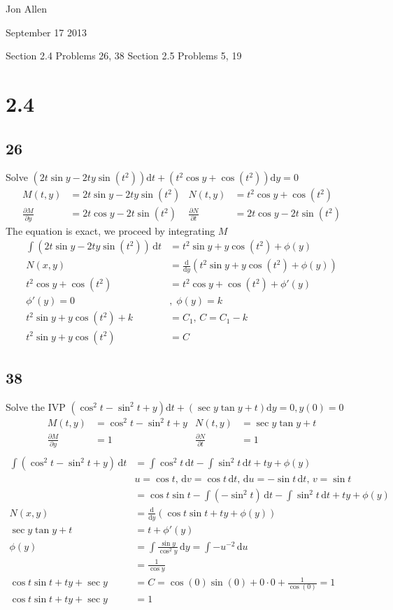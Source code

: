 \documentclass{article}
\begin{document}
Jon Allen

September 17 2013

Section 2.4 Problems 26, 38 Section 2.5 Problems 5, 19
\section*{2.4}
\subsection*{26}
Solve $\left(2t\sin y-2ty\sin(t^2)\right)\mathrm{d}t+\left(t^2\cos y+\cos(t^2)\right)\mathrm{d}y=0$
\begin{align*}
M(t,y)&=2t\sin y-2ty\sin(t^2) & N(t,y)&=t^2\cos y+\cos(t^2)\\
\frac{\partial M}{\partial y}&=2t\cos y-2t\sin(t^2) & \frac{\partial N}{\partial t}&=2t\cos y - 2t\sin(t^2)
\end{align*}
The equation is exact, we proceed by integrating $M$
\begin{align*}
\int{\left(2t\sin y-2ty\sin(t^2)\right)\,\mathrm{d}t}&=t^2\sin y+y\cos(t^2)+\phi(y)\\
N(x,y)&=\frac{\mathrm{d}}{\mathrm{d}y}\left(t^2\sin y+y\cos(t^2)+\phi(y)\right)\\
t^2\cos y+\cos(t^2)&=t^2\cos y+\cos(t^2)+\phi'(y)\\
\phi'(y)=0&,\; \phi(y)=k\\
t^2\sin y+y\cos(t^2) + k&=C_1,\,C=C_1-k\\
t^2\sin y+y\cos(t^2)&=C
\end{align*}
\subsection*{38}
Solve the IVP $\left(\cos^2 t-\sin^2 t+y\right)\mathrm{d}t+\left(\sec y \tan y + t\right)\mathrm{d}y=0,y(0)=0$
\begin{align*}
M(t,y)&=\cos^2 t-\sin^2 t+y & N(t,y)&=\sec y \tan y + t\\
\frac{\partial M}{\partial y}&=1 & \frac{\partial N}{\partial t}&=1\\
\end{align*}
\begin{align*}
\int{\left(\cos^2 t - \sin^2 t + y\right)\,\mathrm{d}t}&=\int{\cos^2 t\,\mathrm{d}t} - \int{\sin^2 t\,\mathrm{d}t} + ty+\phi(y)\\
&u=\cos t,\,\mathrm{d}v=\cos t\,\mathrm{d}t,\,\mathrm{d}u=-\sin t\,\mathrm{d}t,\,v=\sin t\\
&=\cos t\sin t-\int{\left(-\sin^2t\right)\,\mathrm{d}t} - \int{\sin^2 t\,\mathrm{d}t} + ty+\phi(y)\\
N(x,y)&=\frac{\mathrm{d}}{\mathrm{d}y}\left(\cos t\sin t+ty+\phi(y)\right)\\
\sec y \tan y + t&=t+\phi'(y)\\
\phi(y)&=\int{\frac{\sin y}{\cos^2 y}\,\mathrm{d}y}=\int{-u^{-2}\,\mathrm{d}u}\\
&=\frac{1}{\cos y}\\
\cos t\sin t+ty+\sec y&=C=\cos(0)\sin(0)+0\cdot0+\frac{1}{\cos(0)}=1\\
\cos t\sin t+ty+\sec y&=1
\end{align*}
\end{document}

